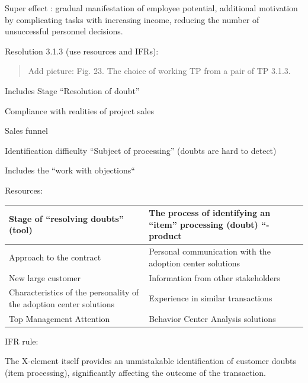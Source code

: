 \documentclass[11pt,a4paper]{book}
\newcommand{\addpicture}[1]{
  \begin{quote} Add picture: #1\end{quote}
}
\begin{document}
Super effect : gradual manifestation of employee potential, additional
motivation by complicating tasks with increasing income, reducing the number
of unsuccessful personnel decisions.

Resolution 3.1.3 (use resources and IFRs):


\addpicture{Fig. 23. The choice of working TP from a pair of TP 3.1.3.}

Includes Stage “Resolution of doubt”

Compliance with realities of project sales

Sales funnel

Identification difficulty “Subject of processing” (doubts are hard to detect)

Includes the “work with objections“


Resources:

\begin{center}
  \begin{tabular}{|p{}|p{}|}\hline 
    Stage of “resolving doubts” (tool) & The process of identifying an “item”
    processing (doubt) “- product\\\hline
    Approach to the contract & Personal communication with the adoption center
    solutions\\\hline
    New large customer & Information from other stakeholders\\\hline
    Characteristics of the personality of the adoption center solutions &
    Experience in similar transactions\\\hline
    Top Management Attention & Behavior Center Analysis solutions\\\hline
  \end{tabular}
\end{center}

IFR rule:

The X-element itself provides an unmistakable identification of customer
doubts (item processing), significantly affecting the outcome of the
transaction.
\end{document}
